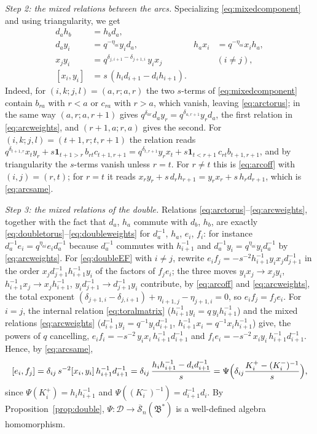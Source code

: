 \documentclass[12pt]{article}
\theoremstyle{remark}
\newcommand{\redS}{\overline{\mathcal S}_n}
\newcommand{\Bstar}{\mathfrak B^*}
\newcommand{\cD}{\mathcal D}
\begin{document}
\emph{Step 2: the mixed relations between the arcs.} Specializing
\eqref{eq:mixedcomponent} and using triangularity, we get
\begin{align}
 d_ah_b&=h_bd_a, \label{eq:arctorus}\\
 d_ay_i&=q^{-\eta_{ai}}y_id_a,&
 h_ax_i&=q^{-\eta_{ai}}x_ih_a, \label{eq:arcweights}\\
 x_jy_i&=q^{\delta_{j,i+1}-\delta_{j+1,i}}\,y_ix_j
                                                    &&(i\ne j), \label{eq:arcoff}\\
 [x_i,y_i]&=s\,(h_id_{i+1}-d_ih_{i+1}). \label{eq:arcsame}
\end{align}
Indeed, for $(i,k;j,l)=(a,r;a,r)$ the two $s$-terms of
\eqref{eq:mixedcomponent} contain $b_{ra}$ with $r<a$ or $c_{ra}$ with
$r>a$, which vanish, leaving \eqref{eq:arctorus}; in the same way
$(a,r;a,r+1)$ gives $q^{\delta_{ar}}d_ay_r=q^{\delta_{a,r+1}}y_rd_a$,
the first relation in \eqref{eq:arcweights}, and $(r+1,a;r,a)$ gives
the second. For $(i,k;j,l)=(t+1,r;t,r+1)$ the relation reads
$q^{\delta_{t+1,r}}x_ty_r+s\mathbf1_{t+1>r}\,b_{rt}c_{t+1,r+1}
 =q^{\delta_{t,r+1}}y_rx_t+s\mathbf1_{t<r+1}\,c_{rt}b_{t+1,r+1}$,
and by triangularity the $s$-terms vanish unless $r=t$. For $r\ne t$
this is \eqref{eq:arcoff} with $(i,j)=(r,t)$; for $r=t$ it reads
$x_ry_r+s\,d_rh_{r+1}=y_rx_r+s\,h_rd_{r+1}$, which is
\eqref{eq:arcsame}.

\emph{Step 3: the mixed relations of the double.} Relations
\eqref{eq:arctorus}--\eqref{eq:arcweights}, together with the fact
that $d_a$, $h_a$ commute with $d_b$, $h_b$, are exactly
\eqref{eq:doubletorus}--\eqref{eq:doubleweights} for $d_a^{-1}$, $h_a$,
$e_i$, $f_i$: for instance $d_a^{-1}e_i=q^{\eta_{ai}}e_id_a^{-1}$
because $d_a^{-1}$ commutes with $h_{i+1}^{-1}$ and
$d_a^{-1}y_i=q^{\eta_{ai}}y_id_a^{-1}$ by \eqref{eq:arcweights}. For
\eqref{eq:doubleEF} with $i\ne j$, rewrite
$e_if_j=-s^{-2}h_{i+1}^{-1}y_ix_jd_{j+1}^{-1}$ in the order
$x_jd_{j+1}^{-1}h_{i+1}^{-1}y_i$ of the factors of $f_je_i$; the three
moves
$y_ix_j\to x_jy_i$, $h_{i+1}^{-1}x_j\to x_jh_{i+1}^{-1}$,
$y_id_{j+1}^{-1}\to d_{j+1}^{-1}y_i$ contribute, by \eqref{eq:arcoff}
and \eqref{eq:arcweights}, the total exponent
$(\delta_{j+1,i}-\delta_{j,i+1})+\eta_{i+1,j}-\eta_{j+1,i}=0$,
so $e_if_j=f_je_i$. For $i=j$, the internal relation
\eqref{eq:toralmatrix} ($h_{i+1}^{-1}y_i=q\,y_ih_{i+1}^{-1}$) and the
mixed relations \eqref{eq:arcweights}
($d_{i+1}^{-1}y_i=q^{-1}y_id_{i+1}^{-1}$,
$h_{i+1}^{-1}x_i=q^{-1}x_ih_{i+1}^{-1}$) give, the powers of $q$
cancelling,
$e_if_i=-s^{-2}\,y_ix_i\,h_{i+1}^{-1}d_{i+1}^{-1}$ and
$f_ie_i=-s^{-2}\,x_iy_i\,h_{i+1}^{-1}d_{i+1}^{-1}$.
Hence, by \eqref{eq:arcsame},
\begin{equation}\label{eq:verifiedEF}
 [e_i,f_j]=\delta_{ij}\,s^{-2}[x_i,y_i]\,h_{i+1}^{-1}d_{i+1}^{-1}
 =\delta_{ij}\,\frac{h_ih_{i+1}^{-1}-d_id_{i+1}^{-1}}s
 =\Psi\Bigl(\delta_{ij}\frac{K^+_i-(K^-_i)^{-1}}s\Bigr),
\end{equation}
since $\Psi(K^+_i)=h_ih_{i+1}^{-1}$ and
$\Psi((K^-_i)^{-1})=d_{i+1}^{-1}d_i$. By Proposition~\ref{prop:double},
$\Psi:\cD\to\redS(\Bstar)$ is a well-defined algebra homomorphism.
\end{document}
